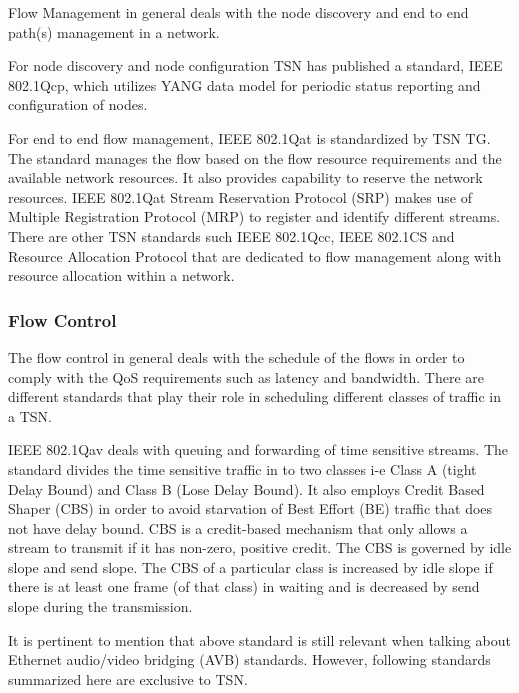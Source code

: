 \documentclass[journal,12pt,twocolumn]{IEEEtran}
\begin{document}
Flow Management in general deals with the node discovery and end to end path(s) management in a network. 

For node discovery and node configuration TSN has published a standard, IEEE 802.1Qcp, which utilizes YANG data model for periodic status reporting and configuration of nodes.

For end to end flow management, IEEE 802.1Qat is standardized by TSN TG. The standard manages the flow based on the flow resource requirements and the available network resources. It also provides capability to reserve the network resources. IEEE 802.1Qat Stream Reservation Protocol (SRP) makes use of Multiple Registration Protocol (MRP) to register and identify different streams. There are other TSN standards such IEEE 802.1Qcc, IEEE 802.1CS and Resource Allocation Protocol that are dedicated to flow management along with resource allocation within a network.
\subsubsection{Flow Control}
The flow control in general deals with the schedule of the flows in order to comply with the QoS requirements such as latency and bandwidth. There are different standards that play their role in scheduling different classes of traffic in a TSN. 

IEEE 802.1Qav deals with queuing and forwarding of time sensitive streams. The standard divides the time sensitive traffic in to two classes i-e Class A (tight Delay Bound) and Class B (Lose Delay Bound). It also employs Credit Based Shaper (CBS) in order to avoid starvation of Best Effort (BE) traffic that does not have delay bound. CBS is a credit-based mechanism that only allows a stream to transmit if it has non-zero, positive credit. The CBS is governed by idle slope and send slope. The CBS of a particular class is increased by idle slope if there is at least one frame (of that class) in waiting and is decreased by send slope during the transmission.

It is pertinent to mention that above standard is still relevant when talking about Ethernet audio/video bridging (AVB) standards. However, following standards summarized here are exclusive to TSN.
\end{document}
